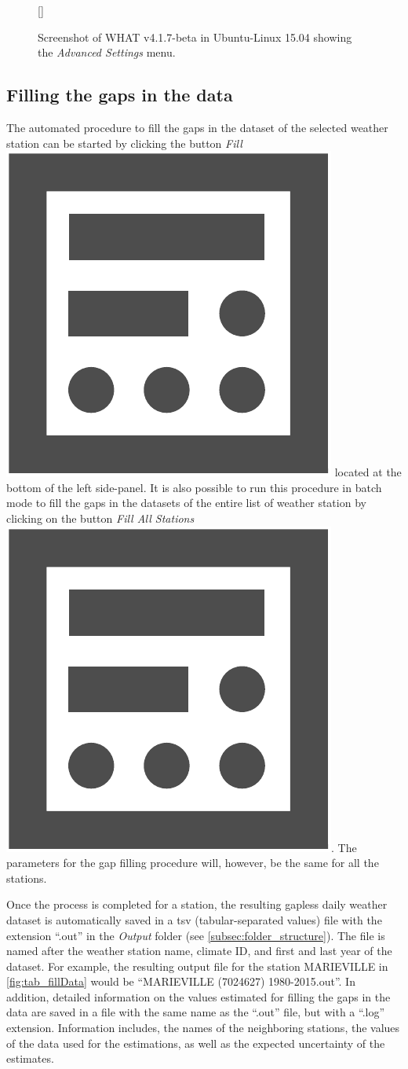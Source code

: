 \documentclass[WHATMANUAL.tex]{subfiles}
\begin{document}
\begin{figure}[!ht]
    \setlength{\fboxsep}{0pt}
    [\FBwidth]
	{
	 \caption{Screenshot of WHAT v4.1.7-beta in Ubuntu-Linux 15.04 showing the \emph{Advanced Settings} menu.}
	 \label{fig:adv_settings}
	}
	{
	}
\end{figure}

\subsection{Filling the gaps in the data}\label{subsec:fillingGaps}

The automated procedure to fill the gaps in the dataset of the selected weather station can be started by clicking the button \emph{Fill}~{\includegraphics[height=2ex]{img/fill_data}} located at the bottom of the left side-panel. It is also possible to run this procedure in batch mode to fill the gaps in the datasets of the entire list of weather station by clicking on the button \emph{Fill All Stations}~{\includegraphics[height=2ex]{img/fill_data}}. The parameters for the gap filling procedure will, however, be the same for all the stations.

Once the process is completed for a station, the resulting gapless daily weather dataset is automatically saved in a tsv (tabular-separated values) file with the extension ``.out'' in the \emph{Output} folder (see \cref{subsec:folder_structure}). The file is named after the weather station name, climate ID, and first and last year of the dataset. For example, the resulting output file for the station MARIEVILLE in \cref{fig:tab_fillData} would be ``MARIEVILLE (7024627) 1980-2015.out''.  In addition, detailed information on the values estimated for filling the gaps in the data are saved in a file with the same name as the ``.out'' file, but with a ``.log'' extension. Information includes, the names of the neighboring stations, the values of the data used for the estimations, as well as the expected uncertainty of the estimates.
\end{document}
